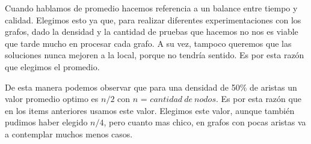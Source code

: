 Cuando hablamos de promedio hacemos referencia a un balance entre tiempo y calidad. Elegimos esto ya que, para realizar diferentes experimentaciones con los grafos, dado la densidad y la cantidad de pruebas que hacemos no nos es viable que tarde mucho en procesar cada grafo. A su vez, tampoco queremos que las soluciones nunca mejoren a la local, porque no tendría sentido. Es por esta razón que elegimos el promedio.

 De esta manera podemos observar que para una densidad de 50$\%$ de aristas un valor promedio optimo es $n/2$ con $n$ = $cantidad\ de\ nodos$. Es por esta razón que en los items anteriores usamos este valor. Elegimos este valor, aunque también pudimos haber elegido $n/4$, pero cuanto mas chico, en grafos con pocas aristas va a contemplar muchos menos casos.

